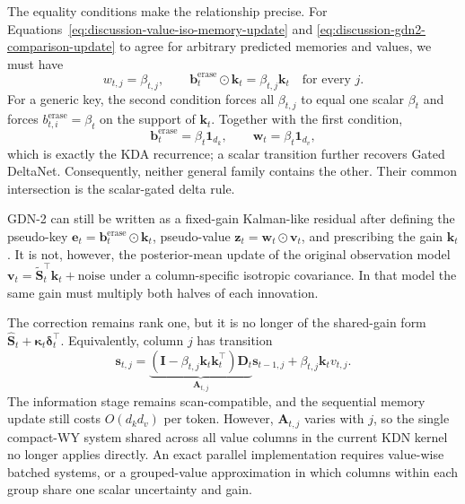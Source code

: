 \documentclass[11pt]{article}
\newcommand{\vct}[1]{\boldsymbol{#1}}
\begin{document}
The equality conditions make the relationship precise. For
Equations~\eqref{eq:discussion-value-iso-memory-update} and
\eqref{eq:discussion-gdn2-comparison-update} to agree for arbitrary predicted memories and values,
we must have
\begin{equation}
  w_{t,j}=\beta_{t,j},
  \qquad
  \vct{b}_t^{\mathrm{erase}}\odot\vct{k}_t
  =\beta_{t,j}\vct{k}_t
  \quad\text{for every }j.
  \label{eq:discussion-value-iso-gdn2-equality}
\end{equation}
For a generic key, the second condition forces all $\beta_{t,j}$ to equal one scalar $\beta_t$
and forces $b_{t,i}^{\mathrm{erase}}=\beta_t$ on the support of $\vct{k}_t$. Together with the
first condition,
\begin{equation}
  \vct{b}_t^{\mathrm{erase}}=\beta_t\vct{1}_{d_k},
  \qquad
  \vct{w}_t=\beta_t\vct{1}_{d_v},
  \label{eq:discussion-value-iso-gdn2-intersection}
\end{equation}
which is exactly the KDA recurrence; a scalar transition further recovers Gated DeltaNet.
Consequently, neither general family contains the other. Their common intersection is the
scalar-gated delta rule.

GDN-2 can still be written as a fixed-gain Kalman-like residual after defining the pseudo-key
$\vct{e}_t=\vct{b}_t^{\mathrm{erase}}\odot\vct{k}_t$, pseudo-value
$\vct{z}_t=\vct{w}_t\odot\vct{v}_t$, and prescribing the gain $\vct{k}_t$. It is not, however,
the posterior-mean update of the original observation model
$\vct{v}_t=\widetilde{\vct{S}}_t^\top\vct{k}_t+\text{noise}$ under a column-specific isotropic
covariance. In that model the same gain must multiply both halves of each innovation.

The correction remains rank one, but it is no longer of the shared-gain form
$\widehat{\vct{S}}_t+\vct{\kappa}_t\vct{\delta}_t^\top$. Equivalently, column $j$ has transition
\begin{equation}
  \vct{s}_{t,j}
  =\underbrace{
    (\vct{I}-\beta_{t,j}\vct{k}_t\vct{k}_t^\top)\vct{D}_t
  }_{\vct{A}_{t,j}}
  \vct{s}_{t-1,j}
  +\beta_{t,j}\vct{k}_t v_{t,j}.
  \label{eq:discussion-value-iso-affine-column}
\end{equation}
The information stage remains scan-compatible, and the sequential memory update still costs
$O(d_kd_v)$ per token. However, $\vct{A}_{t,j}$ varies with $j$, so the single compact-WY system
shared across all value columns in the current KDN kernel no longer applies directly. An exact
parallel implementation requires value-wise batched systems, or a grouped-value approximation in
which columns within each group share one scalar uncertainty and gain.
\end{document}
